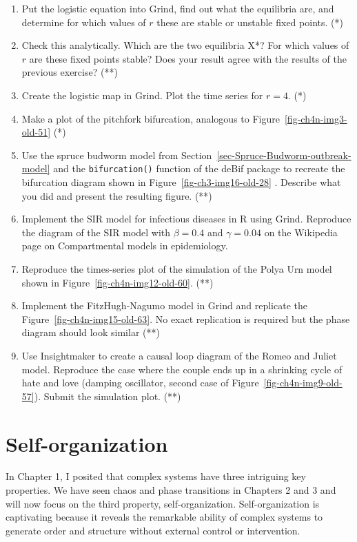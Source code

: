 \documentclass[
  a4paper,
  DIV=11,
  numbers=noendperiod,
  oneside]{scrreprt}
\begin{document}
\begin{enumerate}
\def\labelenumi{\arabic{enumi})}
\item
  Put the logistic equation into Grind, find out what the equilibria
  are, and determine for which values of \(r\) these are stable or
  unstable fixed points. (*)
\item
  Check this analytically. Which are the two equilibria X*? For which
  values of \(r\) are these fixed points stable? Does your result agree
  with the results of the previous exercise? (**)
\item
  Create the logistic map in Grind. Plot the time series for \(r = 4\).
  (*)
\item
  Make a plot of the pitchfork bifurcation, analogous to
  Figure~\ref{fig-ch4n-img3-old-51} (*)
\item
  Use the spruce budworm model from
  Section~\ref{sec-Spruce-Budworm-outbreak-model} and the
  \texttt{bifurcation()} function of the deBif package to recreate the
  bifurcation diagram shown in Figure~\ref{fig-ch3-img16-old-28} .
  Describe what you did and present the resulting figure. (**)
\item
  Implement the SIR model for infectious diseases in R using Grind.
  Reproduce the diagram of the SIR model with \(\beta = 0.4\) and
  \(\gamma = 0.04\) on the Wikipedia page on Compartmental models in
  epidemiology.
\item
  Reproduce the times-series plot of the simulation of the Polya Urn
  model shown in Figure~\ref{fig-ch4n-img12-old-60}. (**)
\item
  Implement the FitzHugh-Nagumo model in Grind and replicate the
  Figure~\ref{fig-ch4n-img15-old-63}. No exact replication is required
  but the phase diagram should look similar (**)
\item
  Use Insightmaker to create a causal loop diagram of the Romeo and
  Juliet model. Reproduce the case where the couple ends up in a
  shrinking cycle of hate and love (damping oscillator, second case of
  Figure~\ref{fig-ch4n-img9-old-57}). Submit the simulation plot. (**)
\end{enumerate}


\hypertarget{sec-ch5n}{%
\chapter{Self-organization}\label{sec-ch5n}}

In Chapter 1, I posited that complex systems have three intriguing key
properties. We have seen chaos and phase transitions in Chapters 2 and 3
and will now focus on the third property, self-organization.
Self-organization is captivating because it reveals the remarkable
ability of complex systems to generate order and structure without
external control or intervention.
\end{document}
